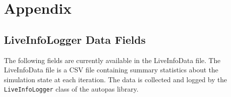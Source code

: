 \chapter{Appendix}

\printglossaries

\newpage

\section{LiveInfoLogger Data Fields}
\label{des:liveinfodatafields}

The following fields are currently available in the LiveInfoData file. The LiveInfoData file is a CSV file containing summary statistics about the simulation state at each iteration. The data is collected and logged by the \texttt{LiveInfoLogger} class of the \gls{autopas} library.

